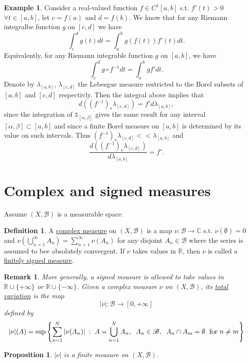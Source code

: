 \documentclass{article}
\newtheorem{proposition}[theorem]{Proposition}
\newtheorem*{remark}{Remark}
\theoremstyle{definition}
\newtheorem{definition}[theorem]{Definition}
\newtheorem{example}[theorem]{Example}
\newcommand{\R}{\mathbb{R}}
\newcommand{\C}{\mathbb{C}}
\newcommand{\omm}{\hspace{1mm}}
\newcommand{\tmm}{\hspace{2mm}}
\newcommand{\one}{\mathds{1}}
\newcommand{\B}{\mathscr{B}}
\begin{document}
\begin{example}
    Consider a real-valued function $f\in C^1[a,b]$ s.t. $f'(t)>0$ $\forall t\in [a,b]$, let $c=f(a)$ and $d=f(b)$. We know that for any Riemann
    integralbe function $g$ on $[c,d]$ we have 
    $$\int_c^d g(t)dt = \int_a^b g(f(t))f'(t)dt.$$
    Equivalently, for any Riemann integrable function $g$ on $[a,b]$, we have $$\int_c^d g\circ f^{-1} dt = \int_a^b g f'dt.$$
    Denote by $\lambda_{[a,b]}$, $\lambda_{[c,d]}$ the Lebesgue measure restricted to the Borel subsets of $[a,b]$ and $[c,d]$ respectivly. Then the integral
    above implies that $$d((f^{-1})_* \lambda_{[c,d]}) = f'd\lambda_{[a,b]},$$
    since the integration of $\one_{[\alpha,\beta]}$ gives the same result for any interval $[\alpha,\beta]\subset [a,b]$ and since a finite Borel measure on $[a,b]$
    is determined by its value on such intervals. Thus $(f^{-1})_* \lambda_{[c,d]}<<\lambda_{[a,b]}$ and $$\frac{d((f^{-1})_* \lambda_{[c,d]})}{d\lambda_{[a,b]}} = f'.$$
\end{example}


\section{Complex and signed measures}
Assume $(X,\B)$ is a measurable space. 
\begin{definition}
    A \underline{complex measure} on $(X,\B)$ is a map $\nu:\B\rightarrow \C$ s.t. $\nu(\emptyset)=0$ and $\nu(\bigcup_{n=1}^\infty A_n) = \sum_{n=1}^{\infty}\nu(A_n)$
    for any disjoint $A_n\in\B$ where the series is assumed to bee absolutely convergent. If $\nu$ takes values in $\R$, then $\nu$ is called a \underline{finitely signed measure}.
\end{definition}

\begin{remark}
    More generally, a signed measure is allowed to take values in $\R\cup\{+\infty\}$ or $\R\cup\{-\infty\}$. Given a complex measure $\nu$ on $(X,\B )$, its 
    \underline{total variation} is the map $$|\nu|:\B\rightarrow [0,+\infty]$$
    defined by $$|\nu|(A) = \sup\left\{ \sum_{n=1}^{N}|\nu(A_n)|\omm:\omm A=\bigcup_{n=1}^N A_n,\tmm A_n\in\B,\tmm A_n\cap A_m=\emptyset \omm \text{  for }n\neq m \right\}$$
\end{remark}

\begin{proposition}
    $|\nu|$ is a finite measure on $(X,\B)$.
\end{proposition}
\end{document}

